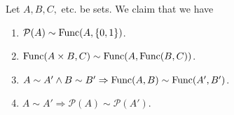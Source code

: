 \documentclass[a4paper,12pt]{article}
\begin{document}
\begin{prp}\label{prop:bij-card}
	\leavevmode \par \noindent
	Let \( A,B,C, \) etc.\! be sets. We claim that we have
	\begin{enumerate}
		\item \label{enu:power_card_func}
		      \( \mathcal{P}(A) \sim \mathrm{Func}(A,\left\{ 0,1 \right\})\).
		      
		\item \label{enu:card_func_augment}
		      \( \mathrm{Func}(A\times B,C) \sim  \mathrm{Func}(A,\mathrm{Func}(B,C))\).
		      
		\item \label{enu:func_card_func}
		      \( A \sim A' \wedge B \sim B' \Rightarrow \mathrm{Func}(A,B)\sim \mathrm{Func}(A',B') \).
		      
		\item \label{enu:power_card_power}
		      \( A \sim A' \Rightarrow \mathcal{P}(A) \sim \mathcal{P}(A') \).
	\end{enumerate}
\end{prp}
\end{document}
